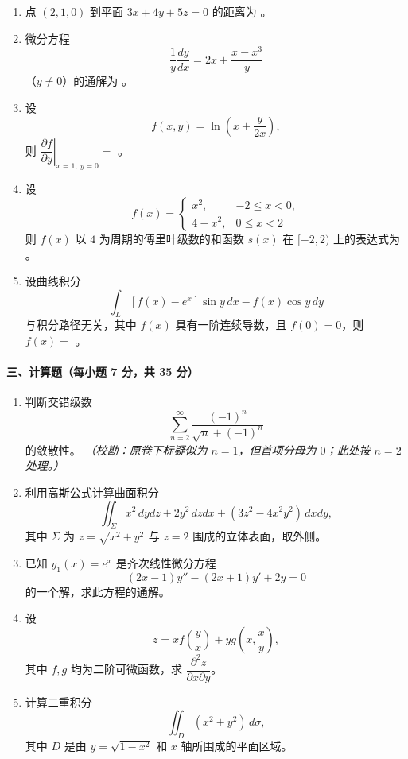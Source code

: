 \begin{enumerate}
  \item 点 $(2,1,0)$ 到平面 $3x+4y+5z=0$ 的距离为 \underline{\hspace{4cm}}。

  \item 微分方程
  \[
    \frac{1}{y}\frac{dy}{dx}=2x+\frac{x-x^3}{y}
  \]
  （$y\ne0$）的通解为 \underline{\hspace{4cm}}。

  \item 设
  \[
    f(x,y)=\ln\left(x+\frac{y}{2x}\right),
  \]
  则 $\left.\dfrac{\partial f}{\partial y}\right|_{x=1,\ y=0}=$ \underline{\hspace{4cm}}。

  \item 设
  \[
    f(x)=
    \begin{cases}
      x^2, & -2\le x<0,\\
      4-x^2, & 0\le x<2
    \end{cases}
  \]
  则 $f(x)$ 以 $4$ 为周期的傅里叶级数的和函数 $s(x)$ 在 $[-2,2)$ 上的表达式为 \underline{\hspace{4cm}}。

  \item 设曲线积分
  \[
    \int_L [f(x)-e^x]\sin y\,dx-f(x)\cos y\,dy
  \]
  与积分路径无关，其中 $f(x)$ 具有一阶连续导数，且 $f(0)=0$，则 $f(x)=$ \underline{\hspace{4cm}}。
\end{enumerate}

\paragraph{三、计算题（每小题 7 分，共 35 分）}

\begin{enumerate}
  \item 判断交错级数
  \[
    \sum_{n=2}^{\infty}\frac{(-1)^n}{\sqrt n+(-1)^n}
  \]
  的敛散性。
  \textit{（校勘：原卷下标疑似为 $n=1$，但首项分母为 $0$；此处按 $n=2$ 处理。）}

  \item 利用高斯公式计算曲面积分
  \[
    \iint_{\Sigma}x^2\,dydz+2y^2\,dzdx+(3z^2-4x^2y^2)\,dxdy,
  \]
  其中 $\Sigma$ 为 $z=\sqrt{x^2+y^2}$ 与 $z=2$ 围成的立体表面，取外侧。

  \item 已知 $y_1(x)=e^x$ 是齐次线性微分方程
  \[
    (2x-1)y''-(2x+1)y'+2y=0
  \]
  的一个解，求此方程的通解。

  \item 设
  \[
    z=xf\left(\frac{y}{x}\right)+yg\left(x,\frac{x}{y}\right),
  \]
  其中 $f,g$ 均为二阶可微函数，求 $\dfrac{\partial^2 z}{\partial x\partial y}$。

  \item 计算二重积分
  \[
    \iint_D (x^2+y^2)\,d\sigma,
  \]
  其中 $D$ 是由 $y=\sqrt{1-x^2}$ 和 $x$ 轴所围成的平面区域。
\end{enumerate}

